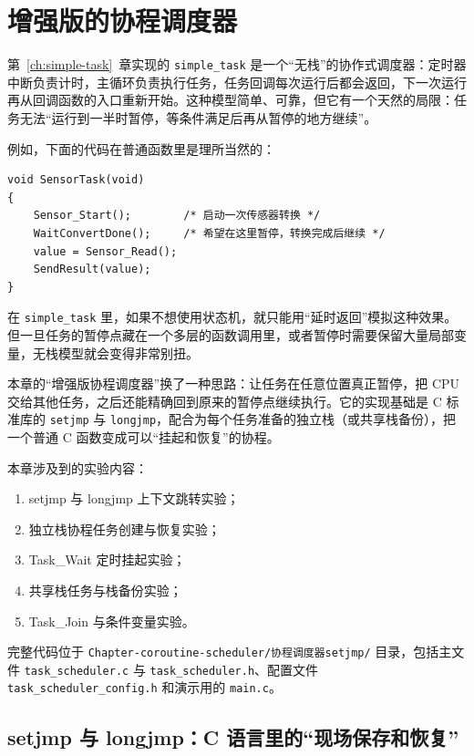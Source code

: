 \chapter{增强版的协程调度器} \label{ch:coroutine-scheduler}

第~\ref{ch:simple-task}~章实现的 \texttt{simple\_task} 是一个“无栈”的协作式调度器：定时器中断负责计时，主循环负责执行任务，任务回调每次运行后都会返回，下一次运行再从回调函数的入口重新开始。这种模型简单、可靠，但它有一个天然的局限：任务无法“运行到一半时暂停，等条件满足后再从暂停的地方继续”。

例如，下面的代码在普通函数里是理所当然的：

\begin{lstlisting}[style=c]
void SensorTask(void)
{
    Sensor_Start();        /* 启动一次传感器转换 */
    WaitConvertDone();     /* 希望在这里暂停，转换完成后继续 */
    value = Sensor_Read();
    SendResult(value);
}
\end{lstlisting}

在 \texttt{simple\_task} 里，如果不想使用状态机，就只能用“延时返回”模拟这种效果。但一旦任务的暂停点藏在一个多层的函数调用里，或者暂停时需要保留大量局部变量，无栈模型就会变得非常别扭。

本章的“增强版协程调度器”换了一种思路：让任务在任意位置真正暂停，把 CPU 交给其他任务，之后还能精确回到原来的暂停点继续执行。它的实现基础是 C 标准库的 \texttt{setjmp} 与 \texttt{longjmp}，配合为每个任务准备的独立栈（或共享栈备份），把一个普通 C 函数变成可以“挂起和恢复”的协程。

\medskip 本章涉及到的实验内容：
\begin{enumerate}
\item setjmp 与 longjmp 上下文跳转实验；
\item 独立栈协程任务创建与恢复实验；
\item Task\_Wait 定时挂起实验；
\item 共享栈任务与栈备份实验；
\item Task\_Join 与条件变量实验。
\end{enumerate}

完整代码位于 \texttt{Chapter-coroutine-scheduler/协程调度器setjmp/} 目录，包括主文件 \texttt{task\_scheduler.c} 与 \texttt{task\_scheduler.h}、配置文件\texttt{task\_scheduler\_config.h} 和演示用的 \texttt{main.c}。

\section{setjmp 与 longjmp：C 语言里的“现场保存和恢复”}

